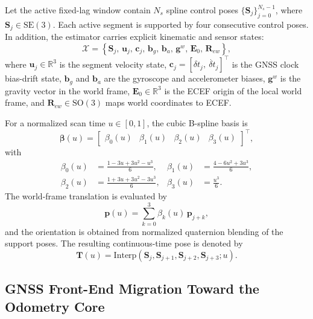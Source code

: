 \documentclass[journal]{IEEEtran}
\begin{document}
Let the active fixed-lag window contain $N_s$ spline control poses
$\{\mathbf{S}_j\}_{j=0}^{N_s-1}$, where $\mathbf{S}_j \in \mathrm{SE}(3)$.
Each active segment is supported by four consecutive control poses. In
addition, the estimator carries explicit kinematic and sensor states:
\begin{equation}
\mathcal{X} =
\left\{
\mathbf{S}_j,\,
\mathbf{u}_j,\,
\mathbf{c}_j,\,
\mathbf{b}_g,\,
\mathbf{b}_a,\,
\mathbf{g}^w,\,
\mathbf{E}_0,\,
\mathbf{R}_{ew}
\right\},
\label{eq:full_state}
\end{equation}
where $\mathbf{u}_j \in \mathbb{R}^3$ is the segment velocity state,
$\mathbf{c}_j = [\delta t_j,\ \dot{\delta t}_j]^\top$ is the GNSS clock
bias-drift state, $\mathbf{b}_g$ and $\mathbf{b}_a$ are the gyroscope and
accelerometer biases, $\mathbf{g}^w$ is the gravity vector in the world frame,
$\mathbf{E}_0 \in \mathbb{R}^3$ is the ECEF origin of the local world frame,
and $\mathbf{R}_{ew} \in \mathrm{SO}(3)$ maps world coordinates to ECEF.

For a normalized scan time $u \in [0,1]$, the cubic B-spline basis is
\begin{equation}
\bm{\beta}(u) =
\begin{bmatrix}
\beta_0(u) & \beta_1(u) & \beta_2(u) & \beta_3(u)
\end{bmatrix}^{\top},
\label{eq:bspline_basis_vector}
\end{equation}
with
\begin{align}
\beta_0(u) &= \frac{1 - 3u + 3u^2 - u^3}{6}, &
\beta_1(u) &= \frac{4 - 6u^2 + 3u^3}{6}, \nonumber\\
\beta_2(u) &= \frac{1 + 3u + 3u^2 - 3u^3}{6}, &
\beta_3(u) &= \frac{u^3}{6}.
\label{eq:bspline_basis}
\end{align}
The world-frame translation is evaluated by
\begin{equation}
\mathbf{p}(u) = \sum_{k=0}^{3} \beta_k(u)\,\mathbf{p}_{j+k},
\label{eq:bspline_translation}
\end{equation}
and the orientation is obtained from normalized quaternion blending of the
support poses. The resulting continuous-time pose is denoted by
\begin{equation}
\mathbf{T}(u) = \mathrm{Interp}\!\left(
\mathbf{S}_j,\mathbf{S}_{j+1},\mathbf{S}_{j+2},\mathbf{S}_{j+3};u
\right).
\label{eq:bspline_pose}
\end{equation}

\subsection{GNSS Front-End Migration Toward the Odometry Core}
\label{sec:gnss_frontend}
\end{document}
